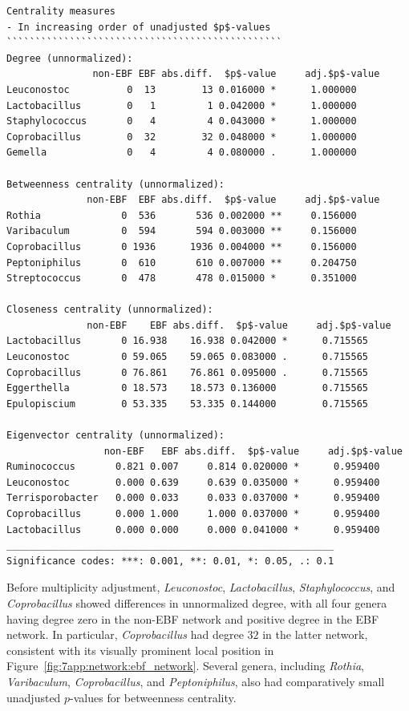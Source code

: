 \begin{Verbatim}[fontsize=\footnotesize]
Centrality measures
- In increasing order of unadjusted $p$-values
````````````````````````````````````````````````
Degree (unnormalized):
               non-EBF EBF abs.diff.  $p$-value     adj.$p$-value  
Leuconostoc          0  13        13 0.016000 *      1.000000  
Lactobacillus        0   1         1 0.042000 *      1.000000  
Staphylococcus       0   4         4 0.043000 *      1.000000  
Coprobacillus        0  32        32 0.048000 *      1.000000  
Gemella              0   4         4 0.080000 .      1.000000  

Betweenness centrality (unnormalized):
              non-EBF  EBF abs.diff.  $p$-value     adj.$p$-value  
Rothia              0  536       536 0.002000 **     0.156000  
Varibaculum         0  594       594 0.003000 **     0.156000  
Coprobacillus       0 1936      1936 0.004000 **     0.156000  
Peptoniphilus       0  610       610 0.007000 **     0.204750  
Streptococcus       0  478       478 0.015000 *      0.351000  

Closeness centrality (unnormalized):
              non-EBF    EBF abs.diff.  $p$-value     adj.$p$-value  
Lactobacillus       0 16.938    16.938 0.042000 *      0.715565  
Leuconostoc         0 59.065    59.065 0.083000 .      0.715565  
Coprobacillus       0 76.861    76.861 0.095000 .      0.715565  
Eggerthella         0 18.573    18.573 0.136000        0.715565  
Epulopiscium        0 53.335    53.335 0.144000        0.715565  

Eigenvector centrality (unnormalized):
                 non-EBF   EBF abs.diff.  $p$-value     adj.$p$-value  
Ruminococcus       0.821 0.007     0.814 0.020000 *      0.959400  
Leuconostoc        0.000 0.639     0.639 0.035000 *      0.959400  
Terrisporobacter   0.000 0.033     0.033 0.037000 *      0.959400  
Coprobacillus      0.000 1.000     1.000 0.037000 *      0.959400  
Lactobacillus      0.000 0.000     0.000 0.041000 *      0.959400  
_________________________________________________________
Significance codes: ***: 0.001, **: 0.01, *: 0.05, .: 0.1
\end{Verbatim}

Before multiplicity adjustment, \emph{Leuconostoc}, \emph{Lactobacillus}, \emph{Staphylococcus}, and \emph{Coprobacillus} showed differences in unnormalized degree, with all four genera having degree zero in the non-EBF network and positive degree in the EBF network. In particular, \emph{Coprobacillus} had degree $32$ in the latter network, consistent with its visually prominent local position in Figure~\ref{fig:7app:network:ebf_network}. Several genera, including \emph{Rothia}, \emph{Varibaculum}, \emph{Coprobacillus}, and \emph{Peptoniphilus}, also had comparatively small unadjusted $p$-values for betweenness centrality.

